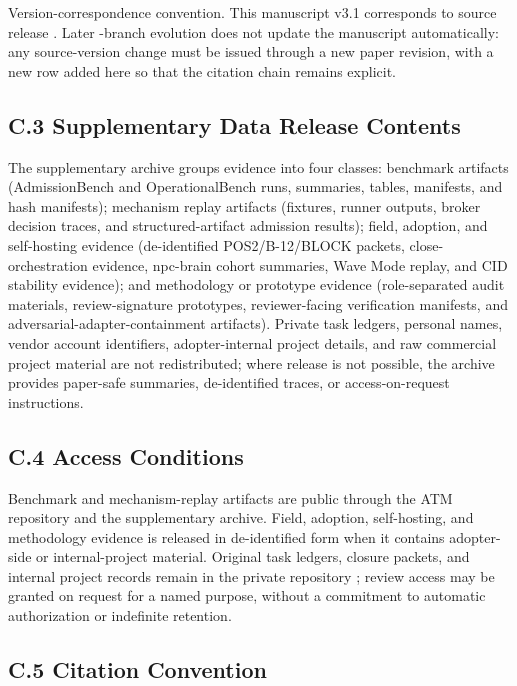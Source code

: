 \documentclass[9pt,letterpaper]{extarticle}
\begin{document}
Version-correspondence convention. This manuscript v3.1 corresponds to source release \texttt{}. Later \texttt{}-branch evolution does not update the manuscript automatically: any source-version change must be issued through a new paper revision, with a new row added here so that the citation chain remains explicit.

\subsection*{C.3 Supplementary Data Release Contents}

The supplementary archive groups evidence into four classes: benchmark artifacts (AdmissionBench and OperationalBench runs, summaries, tables, manifests, and hash manifests); mechanism replay artifacts (fixtures, runner outputs, broker decision traces, and structured-artifact admission results); field, adoption, and self-hosting evidence (de-identified POS2/B-12/BLOCK packets, close-orchestration evidence, npc-brain cohort summaries, Wave Mode replay, and CID stability evidence); and methodology or prototype evidence (role-separated audit materials, review-signature prototypes, reviewer-facing verification manifests, and adversarial-adapter-containment artifacts). Private task ledgers, personal names, vendor account identifiers, adopter-internal project details, and raw commercial project material are not redistributed; where release is not possible, the archive provides paper-safe summaries, de-identified traces, or access-on-request instructions.

\subsection*{C.4 Access Conditions}

Benchmark and mechanism-replay artifacts are public through the ATM repository and the supplementary archive. Field, adoption, self-hosting, and methodology evidence is released in de-identified form when it contains adopter-side or internal-project material. Original task ledgers, closure packets, and internal project records remain in the private repository \texttt{}; review access may be granted on request for a named purpose, without a commitment to automatic authorization or indefinite retention.

\subsection*{C.5 Citation Convention}
\end{document}
